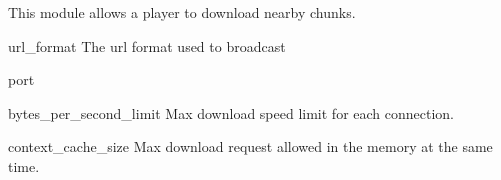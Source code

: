 
This module allows a player to download nearby chunks.

\begin{Configuration}
    \item[url\_format]{
        The url format used to broadcast
    }

    \item[port]

    \item[bytes\_per\_second\_limit]{
        Max download speed limit for each connection.
    }

    \item[context\_cache\_size]{
        Max download request allowed in the memory at the same time.
    }
\end{Configuration}


